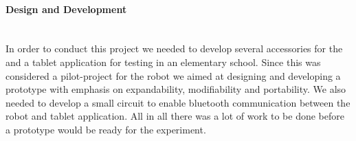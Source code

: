 \paragraph{Design and Development}~\\
In order to conduct this project we needed to develop several accessories for the \chirp and a tablet application for testing in an elementary school. 
Since this was considered a pilot-project for the \chirp robot we aimed at designing and developing a prototype with emphasis on expandability, modifiability and portability. 
We also needed to develop a small circuit to enable bluetooth communication between the robot and tablet application. 
All in all there was a lot of work to be done before a prototype would be ready for the experiment. 



